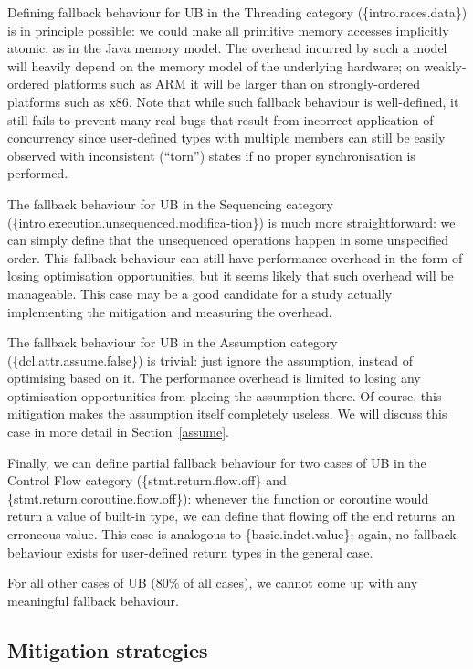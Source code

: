 Defining fallback behaviour for UB in the Threading category (\{intro.races.data\}) is in principle possible: we could make all primitive memory accesses implicitly atomic, as in the Java memory model. The overhead incurred by such a model will heavily depend on the memory model of the underlying hardware; on weakly-ordered platforms such as ARM it will be larger than on strongly-ordered platforms such as x86. Note that while such fallback behaviour is well-defined, it still fails to prevent many real bugs that result from incorrect application of concurrency since user-defined types with multiple members can still be easily observed with inconsistent (``torn'') states if no proper synchronisation is performed.

The fallback behaviour for UB in the Sequencing category (\{intro.execution.unsequenced.modifica-tion\}) 
is much more straightforward: we can simply define that the unsequenced operations happen in some unspecified order. This fallback behaviour can still have performance overhead in the form of losing  optimisation opportunities, but it seems likely that such overhead will be manageable. This case may be a good candidate for a study actually implementing the mitigation and measuring the overhead.

The fallback behaviour for UB in the Assumption category (\{dcl.attr.assume.false\}) is trivial: just ignore the assumption, instead of optimising based on it. The performance overhead is limited to losing any optimisation opportunities from placing the assumption there. Of course, this mitigation makes the assumption itself completely useless. We will discuss this case in more detail in Section~\ref{assume}.

Finally, we can define partial fallback behaviour for two cases of UB in the Control Flow category  (\{stmt.return.flow.off\} and \{stmt.return.coroutine.flow.off\}): whenever the function or coroutine would return a value of built-in type, we can define that flowing off the end returns an erroneous value. This case is analogous to \{basic.indet.value\}; again, no fallback behaviour exists for user-defined return types in the general case.

For all other cases of UB (80\% of all cases), we cannot come up with any meaningful fallback behaviour.

\subsection{Mitigation strategies}
\label{mitigation}

